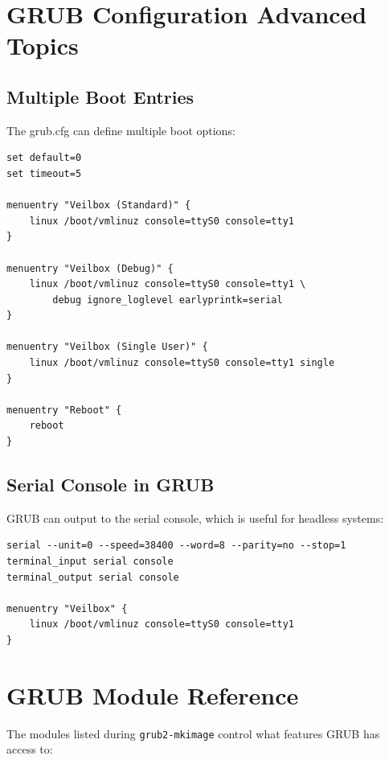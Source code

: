 \section{GRUB Configuration Advanced Topics}

\subsection{Multiple Boot Entries}

The grub.cfg can define multiple boot options:

\begin{lstlisting}
set default=0
set timeout=5

menuentry "Veilbox (Standard)" {
    linux /boot/vmlinuz console=ttyS0 console=tty1
}

menuentry "Veilbox (Debug)" {
    linux /boot/vmlinuz console=ttyS0 console=tty1 \
        debug ignore_loglevel earlyprintk=serial
}

menuentry "Veilbox (Single User)" {
    linux /boot/vmlinuz console=ttyS0 console=tty1 single
}

menuentry "Reboot" {
    reboot
}
\end{lstlisting}

\subsection{Serial Console in GRUB}

GRUB can output to the serial console, which is useful for headless systems:

\begin{lstlisting}
serial --unit=0 --speed=38400 --word=8 --parity=no --stop=1
terminal_input serial console
terminal_output serial console

menuentry "Veilbox" {
    linux /boot/vmlinuz console=ttyS0 console=tty1
}
\end{lstlisting}

\section{GRUB Module Reference}

The modules listed during \texttt{grub2-mkimage} control what features
GRUB has access to:

